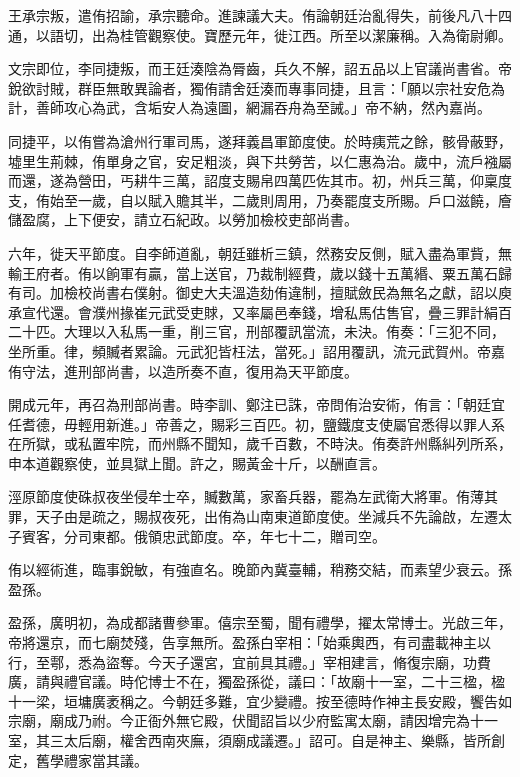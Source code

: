 \begin{pinyinscope}
 王承宗叛，遣侑招諭，承宗聽命。進諫議大夫。侑論朝廷治亂得失，前後凡八十四通，以語切，出為桂管觀察使。寶歷元年，徙江西。所至以潔廉稱。入為衛尉卿。



 文宗即位，李同捷叛，而王廷湊陰為脣齒，兵久不解，詔五品以上官議尚書省。帝銳欲討賊，群臣無敢異論者，獨侑請舍廷湊而專事同捷，且言：「願以宗社安危為計，善師攻心為武，含垢安人為遠圖，網漏吞舟為至誡。」帝不納，然內嘉尚。



 同捷平，以侑嘗為滄州行軍司馬，遂拜義昌軍節度使。於時痍荒之餘，骸骨蔽野，墟里生荊棘，侑單身之官，安足粗淡，與下共勞苦，以仁惠為治。歲中，流戶襁屬而還，遂為營田，丐耕牛三萬，詔度支賜帛四萬匹佐其市。初，州兵三萬，仰稟度支，侑始至一歲，自以賦入贍其半，二歲則周用，乃奏罷度支所賜。戶口滋饒，廥儲盈腐，上下便安，請立石紀政。以勞加檢校吏部尚書。



 六年，徙天平節度。自李師道亂，朝廷雖析三鎮，然務安反側，賦入盡為軍貲，無輸王府者。侑以餉軍有贏，當上送官，乃裁制經費，歲以錢十五萬緡、粟五萬石歸有司。加檢校尚書右僕射。御史大夫溫造劾侑違制，擅賦斂民為無名之獻，詔以庾承宣代還。會濮州掾崔元武受吏賕，又率屬邑奉錢，增私馬估售官，疊三罪計絹百二十匹。大理以入私馬一重，削三官，刑部覆訊當流，未決。侑奏：「三犯不同，坐所重。律，頻贓者累論。元武犯皆枉法，當死。」詔用覆訊，流元武賀州。帝嘉侑守法，進刑部尚書，以造所奏不直，復用為天平節度。



 開成元年，再召為刑部尚書。時李訓、鄭注已誅，帝問侑治安術，侑言：「朝廷宜任耆德，毋輕用新進。」帝善之，賜彩三百匹。初，鹽鐵度支使屬官悉得以罪人系在所獄，或私置牢院，而州縣不聞知，歲千百數，不時決。侑奏許州縣糾列所系，申本道觀察使，並具獄上聞。許之，賜黃金十斤，以酬直言。



 涇原節度使硃叔夜坐侵牟士卒，贓數萬，家畜兵器，罷為左武衛大將軍。侑薄其罪，天子由是疏之，賜叔夜死，出侑為山南東道節度使。坐減兵不先論啟，左遷太子賓客，分司東都。俄領忠武節度。卒，年七十二，贈司空。



 侑以經術進，臨事銳敏，有強直名。晚節內冀臺輔，稍務交結，而素望少衰云。孫盈孫。



 盈孫，廣明初，為成都諸曹參軍。僖宗至蜀，聞有禮學，擢太常博士。光啟三年，帝將還京，而七廟焚殘，告享無所。盈孫白宰相：「始乘輿西，有司盡載神主以行，至鄠，悉為盜奪。今天子還宮，宜前具其禮。」宰相建言，脩復宗廟，功費廣，請與禮官議。時佗博士不在，獨盈孫從，議曰：「故廟十一室，二十三楹，楹十一梁，垣墉廣袤稱之。今朝廷多難，宜少變禮。按至德時作神主長安殿，饗告如宗廟，廟成乃祔。今正衙外無它殿，伏聞詔旨以少府監寓太廟，請因增完為十一室，其三太后廟，權舍西南夾廡，須廟成議遷。」詔可。自是神主、樂縣，皆所創定，舊學禮家當其議。




\end{pinyinscope}
